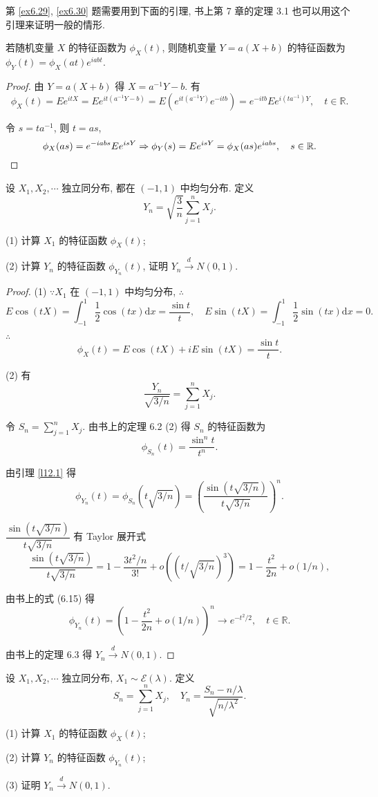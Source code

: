 \documentclass[color=black,device=normal,lang=cn]{elegantnote}
\numberwithin{equation}{section}
\theoremstyle{plain}
\numberwithin{exercise}{exsection}
\begin{document}
第 \ref{ex6.29}, \ref{ex6.30} 题需要用到下面的引理, 书上第 7 章的定理 3.1 也可以用这个引理来证明一般的情形.
\begin{lemma}\label{l12.1}
    若随机变量 $X$ 的特征函数为 $\phi_X(t)$, 则随机变量 $Y=a(X+b)$ 的特征函数为 $\phi_Y(t)=\phi_X(at)e^{iabt}$.
\end{lemma}
\begin{proof}
    由 $Y=a(X+b)$ 得 $X=a^{-1}Y-b$. 有
    \[\phi_X(t)=Ee^{itX}=Ee^{it(a^{-1}Y-b)}=E(e^{it(a^{-1}Y)}e^{-itb})=e^{-itb}Ee^{i(ta^{-1})Y},\quad t\in\mathbb{R}.\]

    令 $s=ta^{-1}$, 则 $t=as$,
    \[\phi_X(as)=e^{-iabs}Ee^{isY}\Rightarrow\phi_Y(s)=Ee^{isY}=\phi_X(as)e^{iabs},\quad s\in\mathbb{R}.\qedhere\]
\end{proof}
\begin{exercise}\label{ex6.29}
    设 $X_1,X_2,\cdots$ 独立同分布, 都在 $(-1,1)$ 中均匀分布. 定义
    \[Y_n=\sqrt{\dfrac{3}{n}}\sum\limits_{j=1}^nX_j.\]

    (1) 计算 $X_1$ 的特征函数 $\phi_X(t)$;

    (2) 计算 $Y_n$ 的特征函数 $\phi_{Y_n}(t)$, 证明 $Y_n\xrightarrow{d}N(0,1)$.
\end{exercise}
\begin{proof}
    (1) $\because X_1$ 在 $(-1,1)$ 中均匀分布, $\therefore$
    \[E\cos(tX)=\int_{-1}^1\dfrac{1}{2}\cos(tx)\mathrm{d}x=\dfrac{\sin t}{t},\quad E\sin(tX)=\int_{-1}^1\dfrac{1}{2}\sin(tx)\mathrm{d}x=0.\]

    $\therefore$
    \[\phi_X(t)=E\cos(tX)+iE\sin(tX)=\dfrac{\sin t}{t}.\]

    (2) 有
    \[\dfrac{Y_n}{\sqrt{3/n}}=\sum\limits_{j=1}^nX_j.\]

    令 $S_n=\sum\limits_{j=1}^nX_j$. 由书上的定理 6.2 (2) 得 $S_n$ 的特征函数为
    \[\phi_{S_n}(t)=\dfrac{\sin^nt}{t^n}.\]

    由引理 \ref{l12.1} 得
    \[\phi_{Y_n}(t)=\phi_{S_n}(t\sqrt{3/n})=\left(\dfrac{\sin(t\sqrt{3/n})}{t\sqrt{3/n}}\right)^n.\]

    $\dfrac{\sin(t\sqrt{3/n})}{t\sqrt{3/n}}$ 有 Taylor 展开式
    \[\dfrac{\sin(t\sqrt{3/n})}{t\sqrt{3/n}}=1-\dfrac{3t^2/n}{3!}+o((t/\sqrt{3/n})^3)=1-\dfrac{t^2}{2n}+o(1/n),\]

    由书上的式 (6.15) 得
    \[\phi_{Y_n}(t)=\left(1-\dfrac{t^2}{2n}+o(1/n)\right)^n\to e^{-t^2/2},\quad t\in\mathbb{R}.\]

    由书上的定理 6.3 得 $Y_n\xrightarrow{d}N(0,1)$.
\end{proof}
\begin{exercise}\label{ex6.30}
    设 $X_1,X_2,\cdots$ 独立同分布, $X_1\sim\mathcal{E}(\lambda)$. 定义
    \[S_n=\sum\limits_{j=1}^nX_j,\quad Y_n=\dfrac{S_n-n/\lambda}{\sqrt{n/\lambda^2}}.\]

    (1) 计算 $X_1$ 的特征函数 $\phi_X(t)$;

    (2) 计算 $Y_n$ 的特征函数 $\phi_{Y_n}(t)$;

    (3) 证明 $Y_n\xrightarrow{d}N(0,1)$.
\end{exercise}
\end{document}
